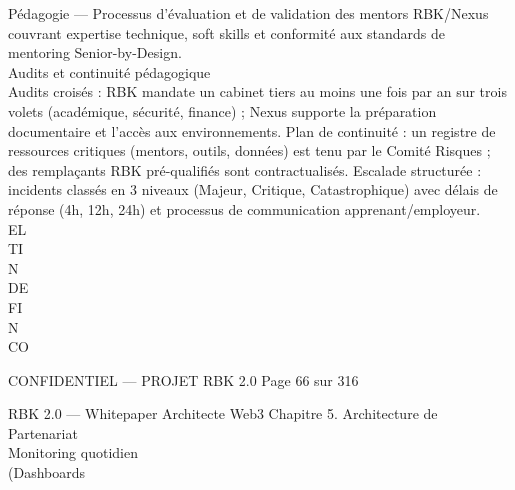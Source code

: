 Pédagogie — Processus d’évaluation et de validation des mentors RBK/Nexus couvrant expertise technique, soft skills et conformité aux standards de\\
mentoring Senior-by-Design.\\
\vspace{0.5em}
\vspace{0.5em}
Audits et continuité pédagogique\\
\vspace{0.5em}
Audits croisés : RBK mandate un cabinet tiers au moins une fois par an sur trois volets (académique, sécurité, finance) ; Nexus supporte la préparation\\
documentaire et l’accès aux environnements. Plan de continuité : un registre de ressources critiques (mentors, outils, données) est tenu par le Comité Risques ;\\
des remplaçants RBK pré-qualifiés sont contractualisés. Escalade structurée : incidents classés en 3 niveaux (Majeur, Critique, Catastrophique) avec délais de\\
réponse (4h, 12h, 24h) et processus de communication apprenant/employeur.\\
\vspace{0.5em}
\vspace{0.5em}
\vspace{0.5em}
\vspace{0.5em}
EL\\
TI\\
N\\
DE\\
FI\\
N\\
CO\\
\vspace{0.5em}
\vspace{0.5em}
\vspace{0.5em}
\vspace{0.5em}
\begin{confidential}CONFIDENTIEL — PROJET RBK 2.0                                           Page 66 sur 316\end{confidential}
RBK 2.0 — Whitepaper Architecte Web3                                                                                                Chapitre 5. Architecture de Partenariat\\
\vspace{0.5em}
\vspace{0.5em}
Monitoring quotidien\\
(Dashboards\\
